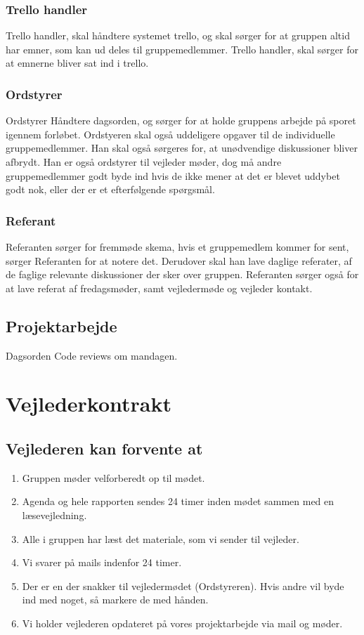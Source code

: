 \subsection{Trello handler}
Trello handler, skal håndtere systemet trello, og skal sørger for at gruppen altid har emner, som kan ud deles til gruppemedlemmer. Trello handler, skal sørger for at emnerne bliver sat ind i trello.

\subsection{Ordstyrer}
Ordstyrer Håndtere dagsorden, og sørger for at holde gruppens arbejde på sporet igennem forløbet. Ordstyeren skal også uddeligere opgaver til de individuelle gruppemedlemmer. Han skal også sørgeres for, at unødvendige diskussioner bliver afbrydt. Han er også ordstyrer til vejleder møder, dog må andre gruppemedlemmer godt byde ind hvis de ikke mener at det er blevet uddybet godt nok, eller der er et efterfølgende spørgsmål.

\subsection{Referant}
Referanten sørger for fremmøde skema, hvis et gruppemedlem kommer for sent, sørger Referanten for at notere det. Derudover skal han lave daglige referater, af de faglige relevante diskussioner der sker over gruppen. Referanten sørger også for at lave referat af fredagsmøder, samt vejledermøde og vejleder kontakt. 

\section{Projektarbejde}
Dagsorden
Code reviews om mandagen.

\chapter{Vejlederkontrakt}
\section{Vejlederen kan forvente at}
\begin{enumerate}
\item Gruppen møder velforberedt op til mødet.
\item Agenda og hele rapporten sendes 24 timer inden mødet sammen med en læsevejledning.
\item Alle i gruppen har læst det materiale, som vi sender til vejleder.
\item Vi svarer på mails indenfor 24 timer.
\item Der er en der snakker til vejledermødet (Ordstyreren). Hvis andre vil byde ind med noget, så markere de med hånden.
\item Vi holder vejlederen opdateret på vores projektarbejde via mail og møder.
\end{enumerate}

